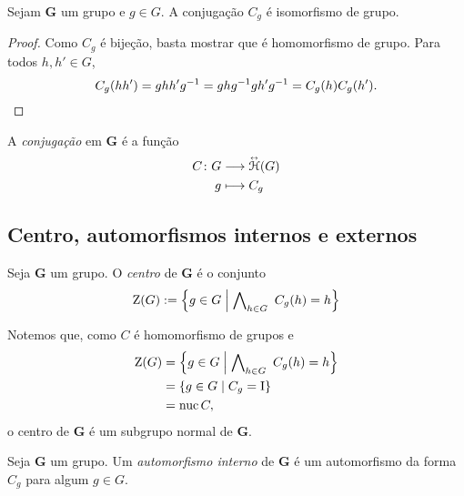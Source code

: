 \begin{proposition}
Sejam $\bm G$ um grupo e $g \in G$. A conjugação $C_g$ é isomorfismo de grupo.
\end{proposition}
\begin{proof}
Como $C_g$ é bijeção, basta mostrar que é homomorfismo de grupo. Para todos $h,h' \in G$,
	\begin{equation*}
		C_g(hh') = ghh'g^{-1} = ghg^{-1} gh'g^{-1} = C_g(h)C_g(h').
	\end{equation*}
\end{proof}

A \emph{conjugação} em $\bm G$ é a função
	\begin{align*}
		{C}\colon {G} &\longrightarrow {\accentset{\leftrightarrow}{\mathcal{H}}(G)} \\{g} &\longmapsto C_g
	\end{align*}

%

\subsection{Centro, automorfismos internos e externos}

\begin{definition}
Seja $\bm G$ um grupo. O \emph{centro} de $\bm G$ é o conjunto
	\begin{equation*}
		\operatorname{Z}(G) := \left\{{g \in G}\;\middle\vert\;{\bigwedge\nolimits_{h \in G}\ C_g(h)=h}\right\}
	\end{equation*}
\end{definition}


Notemos que, como $C$ é homomorfismo de grupos e 
	\begin{align*}
		\operatorname{Z}(G) &= \left\{{g \in G}\;\middle\vert\;{\bigwedge\nolimits_{h \in G}\ C_g(h) = h}\right\} \\
				&= \left\{{g \in G}\;\middle\vert\;{C_g = \mathrm{I}}\right\} \\
				&= \operatorname{nuc}{C},
	\end{align*}
o centro de $\bm G$ é um subgrupo normal de $\bm G$.

\begin{definition}
Seja $\bm G$ um grupo. Um \emph{automorfismo interno} de $\bm G$ é um automorfismo da forma $C_g$ para algum $g \in G$.
\end{definition}

